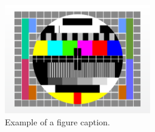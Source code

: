 \documentclass[conference]{IEEEtran}
\begin{document}
%
%
\begin{figure}[!ht]
\centering
\includegraphics[width=2.5in]{myfigure}
\caption{Example of a figure caption.}
\label{fig:example}
\end{figure}



%
%
\end{document}
